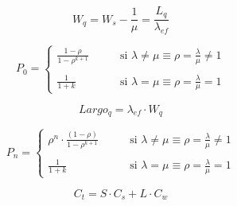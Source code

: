 \documentclass{templateNote}
\newcommand{\newparagraph}{\par\vspace{\baselineskip}\noindent}
\begin{document}
\begin{tcolorbox}[
    colframe=black!100, %
    colback=white!100,       %
    coltitle=white!100, %
    title=\textbf{M/M/1/K}, %
]
\begin{minipage}{0.2\textwidth}
\begin{equation*}
        \end{equation*}
    \end{minipage}
    \newparagraph
    \begin{minipage}{0.3\textwidth}
        \begin{equation*}
            W_q = W_s - \frac{1}{\mu} = \frac{L_q}{\lambda_{ef}}
        \end{equation*}
    \end{minipage}
    \hfill
    \begin{minipage}{0.6\textwidth}
        \begin{equation*}
            P_0 = \begin{cases}
                \displaystyle \frac{1 - \rho}{1 - \rho^{k + 1}} & \qquad \text{si } \lambda \neq \mu \equiv \rho = \frac{\lambda}{\mu} \neq 1 \\
                \\
                \displaystyle \frac{1}{1 + k} & \qquad \text{si } \lambda = \mu \equiv \rho = \frac{\lambda}{\mu} = 1
            \end{cases}
        \end{equation*}
    \end{minipage}
    \newparagraph
    \begin{minipage}{0.3\textwidth}
        \begin{equation*}
            Largo_q = \lambda_{ef} \cdot W_q
        \end{equation*}
    \end{minipage}
    \hfill
    \begin{minipage}{0.6\textwidth}
        \begin{equation*}
            P_n = \begin{cases}
                \displaystyle \rho^n \cdot \frac{(1 - \rho)}{1 - \rho^{k + 1}} & \qquad \text{si } \lambda \neq \mu \equiv \rho = \frac{\lambda}{\mu} \neq 1 \\
                \\
                \displaystyle \frac{1}{1 + k} & \qquad \text{si } \lambda = \mu \equiv \rho = \frac{\lambda}{\mu} = 1
            \end{cases}
        \end{equation*}
    \end{minipage}
\end{tcolorbox}
\begin{tcolorbox}[
    colframe=black!100, %
    colback=white!100,       %
    coltitle=white!100, %
    title=\textbf{Costos en los sistemas de colas}, %
]
    \begin{equation*}
        C_t = S \cdot C_s + L \cdot C_w
    \end{equation*}
\end{tcolorbox}
\end{document}
